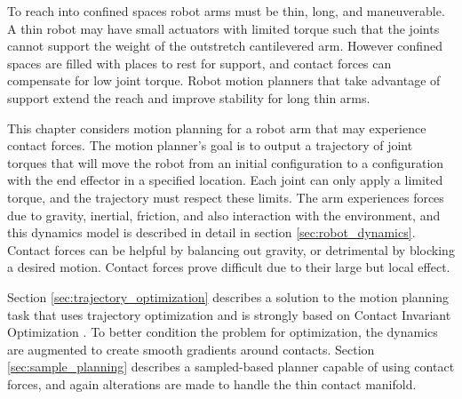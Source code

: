\documentclass[../thesis.tex]{subfiles}
\begin{document}
To reach into confined spaces robot arms must be thin, long, and maneuverable.
A thin robot may have small actuators with limited torque such that the joints cannot support the weight of the outstretch cantilevered arm.
However confined spaces are filled with places to rest for support, and contact forces can compensate for low joint torque. 
Robot motion planners that take advantage of support extend the reach and improve stability for long thin arms.

This chapter considers motion planning for a robot arm that may experience contact forces.
The motion planner's goal is to output a trajectory of joint torques that will move the robot from an initial configuration to a configuration with the end effector in a specified location.
Each joint can only apply a limited torque, and the trajectory must respect these limits.
The arm experiences forces due to gravity, inertial, friction, and also interaction with the environment, and this dynamics model is described in detail in section \ref{sec:robot_dynamics}.
Contact forces can be helpful by balancing out gravity, or detrimental by blocking a desired motion.
Contact forces prove difficult due to their large but local effect.


Section \ref{sec:trajectory_optimization} describes a solution to the motion planning task that uses trajectory optimization and is strongly based on Contact Invariant Optimization \cite{Mordatch2012}.
To better condition the problem for optimization, the dynamics are augmented to create smooth gradients around contacts.
Section \ref{sec:sample_planning} describes a sampled-based planner capable of using contact forces, and again alterations are made to handle the thin contact manifold.







\end{document}

